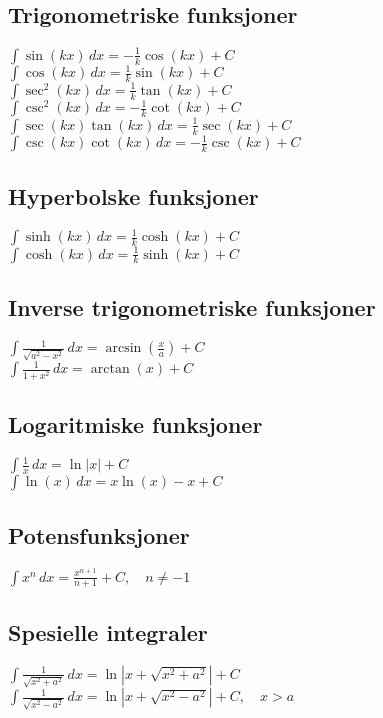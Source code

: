 \documentclass[a4paper,7pt,fleqn]{article}
\begin{document}
\begin{multicols}{2}
\begin{minipage}{\linewidth}
\subsection*{Trigonometriske funksjoner}
\(\int \sin(kx) \, dx = -\frac{1}{k} \cos(kx) + C\) \\
\(\int \cos(kx) \, dx = \frac{1}{k} \sin(kx) + C\) \\
\(\int \sec^2(kx) \, dx = \frac{1}{k} \tan(kx) + C\) \\
\(\int \csc^2(kx) \, dx = -\frac{1}{k} \cot(kx) + C\) \\
\(\int \sec(kx) \tan(kx) \, dx = \frac{1}{k} \sec(kx) + C\) \\
\(\int \csc(kx) \cot(kx) \, dx = -\frac{1}{k} \csc(kx) + C\) \\

\subsection*{Hyperbolske funksjoner}
\(\int \sinh(kx) \, dx = \frac{1}{k} \cosh(kx) + C\) \\
\(\int \cosh(kx) \, dx = \frac{1}{k} \sinh(kx) + C\) \\
\end{minipage}

\begin{minipage}{\linewidth}
\subsection*{Inverse trigonometriske funksjoner}
\(\int \frac{1}{\sqrt{a^2 - x^2}} \, dx = \arcsin\left(\frac{x}{a}\right) + C\) \\
\(\int \frac{1}{1 + x^2} \, dx = \arctan(x) + C\) \\

\subsection*{Logaritmiske funksjoner}
\(\int \frac{1}{x} \, dx = \ln|x| + C\) \\
\(\int \ln(x) \, dx = x\ln(x) - x + C\) \\

\subsection*{Potensfunksjoner}
\(\int x^n \, dx = \frac{x^{n+1}}{n+1} + C, \quad n \neq -1\) \\

\subsection*{Spesielle integraler}
\(\int \frac{1}{\sqrt{x^2 + a^2}} \, dx = \ln\left|x + \sqrt{x^2 + a^2}\right| + C\) \\
\(\int \frac{1}{\sqrt{x^2 - a^2}} \, dx = \ln\left|x + \sqrt{x^2 - a^2}\right| + C, \quad x > a\)
\end{minipage}


\end{multicols}
\end{document}
